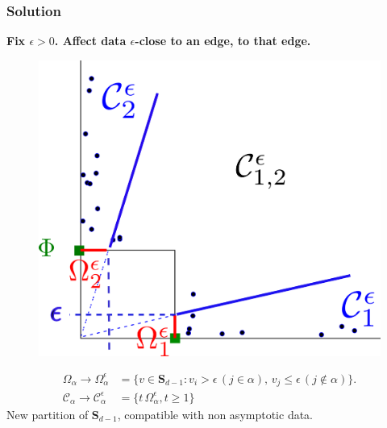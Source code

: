 \documentclass[10pt]{beamer}
\begin{document}
\begin{frame}
\frametitle{Solution}
 \textbf{Fix $\epsilon>0$. Affect data  $\epsilon$-close to an edge,
   to that edge. }

\begin{figure}[h]
  \centering
  \includegraphics[scale=0.33]{sourcefigs/representation2D.png}
\end{figure}

\begin{align*}
\Omega_\alpha  \to  \Omega_\alpha^\epsilon &= \{v\in\mathbf{S}_{d-1}:
v_i>\epsilon\, (j\in\alpha),\,v_j \le \epsilon \,(j\notin\alpha) \}.  \\
\mathcal{C}_\alpha\to \mathcal{C}_\alpha^\epsilon&= \{t\,\Omega_\alpha^\epsilon,t\ge 1\}
\end{align*}
New partition of $\mathbf{S}_{d-1}$, compatible with non asymptotic data.
\end{frame}
\end{document}

